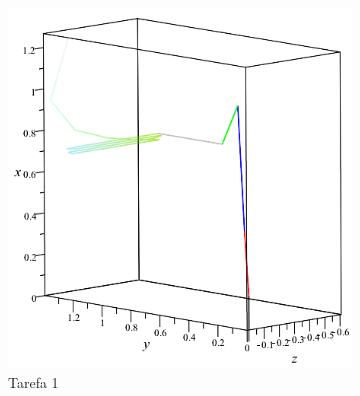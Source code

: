 \begin{figure}[h]
    \centering
    \begin{subfigure}[b]{0.45\textwidth}
        \includegraphics[width=\textwidth]{figs/t1_anima3D_base_rig}
        \caption{Tarefa 1}
        \label{fig::t1_anima3D_base_rig}
    \end{subfigure}
    \quad %
    \begin{subfigure}[b]{0.40\textwidth}

\end{subfigure}
\end{figure}
